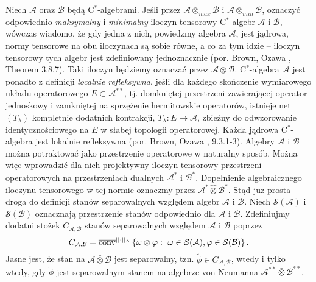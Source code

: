 Niech  $\mathcal{A}$ oraz $\mathcal{B}$ będą C$^{*}$-algebrami.
Jeśli przez $\mathcal{A} \otimes_{max} \mathcal{B}$
i $\mathcal{A} \otimes_{min} \mathcal{B}$,
oznaczyć odpowiednio
\emph{maksymalny} i \emph{minimalny}
iloczyn tensorowy C$^{*}$-algebr $\mathcal{A}$ i $\mathcal{B}$,
wówczas wiadomo, że gdy jedna z nich, powiedzmy algebra $\mathcal{A}$,
jest jądrowa, normy tensorowe na obu iloczynach są sobie równe,
a co za tym idzie -- iloczyn tensorowy tych algebr jest zdefiniowany
jednoznacznie (por. Brown, Ozawa \cite{Brown2008}, Theorem 3.8.7).
Taki iloczyn będziemy oznaczać przez
$\mathcal{A} \bar{\otimes} \mathcal{B}$.
C$^{*}$-algebra $\mathcal{A}$ jest ponadto z definicji \emph{localnie refleksywna},
jeśli dla każdego skończenie wymiarowego układu operatorowego
$E \subset \mathcal{A}^{**}$,
tj. domkniętej przestrzeni zawierającej operator jednoskowy i zamkniętej
na sprzężenie hermitowskie operatorów,
istnieje net $(T_{\lambda})$ kompletnie dodatnich kontrakcji,
$T_{\lambda}: E \rightarrow \mathcal{A}$,
zbieżny do odwzorowanie identycznościowego na $E$
w słabej topologii operatorowej.
Każda jądrowa C$^{*}$-algebra jest lokalnie refleksywna
(por. Brown, Ozawa \cite{Brown2008}, 9.3.1-3).
Algebry $\mathcal{A}$ i $\mathcal{B}$
można potraktować jako przestrzenie operatorowe w naturalny sposób.
Można więc wprowadzić dla nich projektywny iloczyn tensorowy
przestrzeni operatorowych na przestrzeniach dualnych
$\mathcal{A}^{*}$ i $\mathcal{B}^{*}$.
Dopełnienie algebraicznego iloczynu tensorowego w tej normie oznaczmy przez
$\mathcal{A}^{*} \hat{\otimes} \mathcal{B}^{*}$.
Stąd juz prosta droga do definicji stanów separowalnych względem
algebr $\mathcal{A}$ i  $\mathcal{B}$.
Niech
$\mathcal{S}(\mathcal{A})$ i $\mathcal{S}(\mathcal{B})$
oznacznają przestrzenie stanów odpowiednio dla $\mathcal{A}$ i $\mathcal{B}$.
Zdefiniujmy dodatni stożek $C_{\mathcal{A},\mathcal{B}}$
stanów separowalnych względem  $\mathcal{A}$ i $\mathcal{B}$ poprzez
\begin{equation}
C_{\mathcal{A},\mathcal{B}} =
\overline{{\rm conv}}^{||\cdot||_{\wedge}}
\left \{\omega \otimes \varphi: \, \,\omega \in \mathcal{S}(\mathcal{A}),
\varphi \in \mathcal{S}(\mathcal{B})\right \}.
\end{equation}
Jasne jest, że stan na $\mathcal{A} \bar{\otimes} \mathcal{B}$ jest separowalny,
tzn. $\tilde{\phi} \in C_{\mathcal{A}, \mathcal{B}}$,
wtedy i tylko wtedy, gdy $\tilde{\phi}$ jest separowalnym stanem na
algebrze von Neumanna $\mathcal{A}^{**} \bar{\otimes} \mathcal{B}^{**}$.

